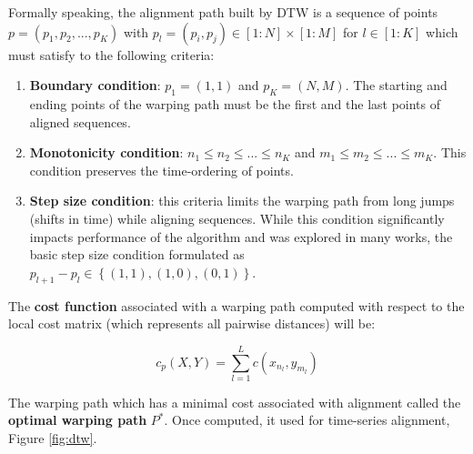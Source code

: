 Formally speaking, the alignment path built by DTW is a sequence of points $p=(p_{1}, p_{2}, ... , p_{K})$ with $p_{l} = (p_{i}, p_{j}) \in [1:N] \times [1:M]$ for $l \in [1:K]$ which must satisfy to the following criteria:
\begin{enumerate}
	\item \textbf{Boundary condition}: $p_{1}=(1,1)$ and $p_{K}=(N,M)$. The starting and ending points of the warping path must be the first and the last points of aligned sequences.
	\item \textbf{Monotonicity condition}: $n_{1} \leq n_{2} \leq ... \leq n_{K}$ and $m_{1} \leq m_{2} \leq ... \leq m_{K}$. This condition preserves the time-ordering of points.
	\item \textbf{Step size condition}: this criteria limits the warping path from long jumps (shifts in time) while aligning sequences. While this condition significantly impacts performance of the algorithm and was explored in many works, the basic step size condition formulated as $p_{l+1}-p_{l} \in \left\{ (1,1), (1,0), (0,1) \right\}$.
\end{enumerate}

The \textbf{cost function} associated with a warping path computed with respect to the local cost matrix (which represents all pairwise distances) will be: 

\begin{equation}
\label{eq:pathcost}
c_{p}(X,Y) = \sum_{l=1}^{L} c(x_{n_{l}}, y_{m_{l}})
\end{equation}

The warping path which has a minimal cost associated with alignment called the \textbf{optimal warping path} $P^{*}$. Once computed, it used for time-series alignment, Figure \ref{fig:dtw}.
